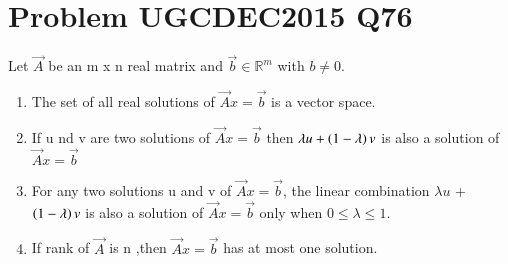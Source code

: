 \documentclass[journal,12pt]{IEEEtran}
\begin{document}
\renewcommand{\thefigure}{\theenumi}
\renewcommand{\thetable}{\theenumi}

\section{\textbf{Problem UGCDEC2015 Q76}}
 Let $\vec{A}$ be an m x n real matrix and $\vec{b}\in \mathbb{R}^m$ with $b\neq 0$.
\begin{enumerate}
    \item The set of all real solutions of $\vec{A}x=\vec{b}$ is a vector space.\\
    \item If u nd v are two solutions of $\vec{A}x=\vec{b}$ then $\lambda u  +\left(1-\lambda\right)v$ is also a solution of $\vec{A}x=\vec{b}$\\
    \item For any two solutions u and v of $\vec{A}x=\vec{b}$, the linear combination $\lambda u$ + $\left(1-\lambda\right)v$ is also a solution of $\vec{A}x=\vec{b}$ only when $0\leq\lambda\leq1.$\\
    \item If rank of $\vec{A}$ is n ,then $\vec{A}x=\vec{b}$ has at most one solution.\ 
    \end{enumerate}
\end{document}
